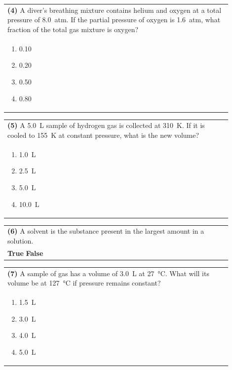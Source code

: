\documentclass{article}
\begin{document}
\vspace{0.2cm}
\noindent\begin{tabular}{|p{0.9\linewidth}|}
\hline
\textbf{(4)} A diver's breathing mixture contains helium and oxygen at a total pressure of 8.0~atm. If the partial pressure of oxygen is 1.6~atm, what fraction of the total gas mixture is oxygen?\\[0.2cm]
\begin{minipage}[t]{0.85\linewidth}
\begin{enumerate}[label=\alph*.]
\item 0.10
\item 0.20
\item 0.50
\item 0.80
\end{enumerate}
\end{minipage}\\[0.2cm]
\hline
\end{tabular}
\newpage

\vspace{0.2cm}
\noindent\begin{tabular}{|p{0.9\linewidth}|}
\hline
\textbf{(5)} A 5.0~L sample of hydrogen gas is collected at 310~K. If it is cooled to 155~K at constant pressure, what is the new volume?\\[0.2cm]
\begin{minipage}[t]{0.85\linewidth}
\begin{enumerate}[label=\alph*.]
\item 1.0~L
\item 2.5~L
\item 5.0~L
\item 10.0~L
\end{enumerate}
\end{minipage}\\[0.2cm]
\hline
\end{tabular}

\noindent\begin{tabular}{|p{0.9\linewidth}|}
\hline
\textbf{(6)} A solvent is the substance present in the largest amount in a solution.\\[0.2cm]
\textbf{True} \hspace{1cm} \textbf{False}\\[0.2cm]
\hline
\end{tabular}

\vspace{0.2cm}
\noindent\begin{tabular}{|p{0.9\linewidth}|}
\hline
\textbf{(7)} A sample of gas has a volume of 3.0~L at 27~°C. What will its volume be at 127~°C if pressure remains constant?\\[0.2cm]
\begin{minipage}[t]{0.85\linewidth}
\begin{enumerate}[label=\alph*.]
\item 1.5~L
\item 3.0~L
\item 4.0~L
\item 5.0~L
\end{enumerate}
\end{minipage}\\[0.2cm]
\hline
\end{tabular}
\end{document}
